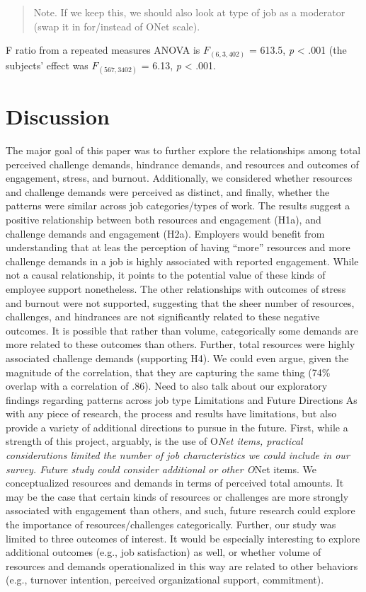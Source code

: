 \documentclass[
  man]{apa6}
\begin{document}
\begin{quote}
Note. If we keep this, we should also look at type of job as a moderator (swap it in for/instead of ONet scale).
\end{quote}

F ratio from a repeated measures ANOVA is \(F_(6, 3,402)\) = 613.5, \emph{p} \textless{} .001 (the subjects' effect was \(F_{(567, 3402)}\) = 6.13, \emph{p} \textless{} .001.

\hypertarget{discussion}{%
\section{Discussion}\label{discussion}}

The major goal of this paper was to further explore the relationships among total perceived challenge demands, hindrance demands, and resources and outcomes of engagement, stress, and burnout. Additionally, we considered whether resources and challenge demands were perceived as distinct, and finally, whether the patterns were similar across job categories/types of work. The results suggest a positive relationship between both resources and engagement (H1a), and challenge demands and engagement (H2a). Employers would benefit from understanding that at leas the perception of having ``more'' resources and more challenge demands in a job is highly associated with reported engagement. While not a causal relationship, it points to the potential value of these kinds of employee support nonetheless. The other relationships with outcomes of stress and burnout were not supported, suggesting that the sheer number of resources, challenges, and hindrances are not significantly related to these negative outcomes. It is possible that rather than volume, categorically some demands are more related to these outcomes than others.
Further, total resources were highly associated challenge demands (supporting H4). We could even argue, given the magnitude of the correlation, that they are capturing the same thing (74\% overlap with a correlation of .86). Need to also talk about our exploratory findings regarding patterns across job type
Limitations and Future Directions
As with any piece of research, the process and results have limitations, but also provide a variety of additional directions to pursue in the future. First, while a strength of this project, arguably, is the use of O\emph{Net items, practical considerations limited the number of job characteristics we could include in our survey. Future study could consider additional or other O}Net items. We conceptualized resources and demands in terms of perceived total amounts. It may be the case that certain kinds of resources or challenges are more strongly associated with engagement than others, and such, future research could explore the importance of resources/challenges categorically. Further, our study was limited to three outcomes of interest. It would be especially interesting to explore additional outcomes (e.g., job satisfaction) as well, or whether volume of resources and demands operationalized in this way are related to other behaviors (e.g., turnover intention, perceived organizational support, commitment).
\end{document}
